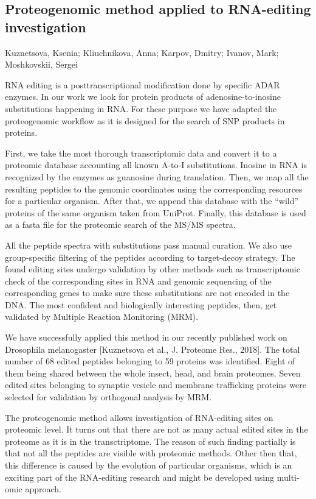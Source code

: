 {\subsection*{\color{eubicRed} Proteogenomic method applied to RNA-editing investigation}
{\color{eubicGray}Kuznetsova, Ksenia;
Kliuchnikova, Anna;
Karpov, Dmitry;
Ivanov, Mark;
Moshkovskii, Sergei}

RNA editing is a posttranscriptional modification done by specific ADAR enzymes. In our work we look for protein products of adenosine-to-inosine substitutions happening in RNA. For these purpose we have adapted the proteogenomic workflow as it is designed for the search of SNP products in proteins.

First, we take the most thorough transcriptomic data and convert it to a proteomic database accounting all known A-to-I substitutions. Inosine in RNA is recognized by the enzymes as guanosine during translation. Then, we map all the resulting peptides to the genomic coordinates using the corresponding resources for a particular organism. After that, we append this database with the “wild” proteins of the same organism taken from UniProt. Finally, this database is used as a fasta file for the proteomic search of the MS/MS spectra.

All the peptide spectra with substitutions pass manual curation. We also use group-specific filtering of the peptides according to target-decoy strategy. The found editing sites undergo validation by other methods such as transcriptomic check of the corresponding sites in RNA and genomic sequencing of the corresponding genes to make sure these substitutions are not encoded in the DNA. The most confident and biologically interesting peptides, then, get validated by Multiple Reaction Monitoring (MRM).

We have successfully applied this method in our recently published work on Drosophila melanogaster [Kuznetsova et al., J. Proteome Res., 2018]. The total number of 68 edited peptides belonging to 59 proteins was identified. Eight of them being shared between the whole insect, head, and brain proteomes. Seven edited sites belonging to synaptic vesicle and membrane trafficking proteins were selected for validation by orthogonal analysis by MRM.

The proteogenomic method allows investigation of RNA-editing sites on proteomic level. It turns out that there are not as many actual edited sites in the proteome as it is in the transctriptome. The reason of such finding partially is that not all the peptides are visible with proteomic methods. Other then that, this difference is caused by the evolution of particular organisms, which is an exciting part of the RNA-editing research and might be developed using multi-omic approach.


}
